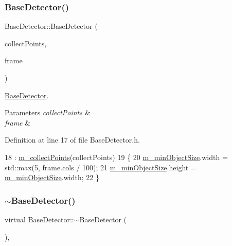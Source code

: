 \subsubsection{\texorpdfstring{Base\+Detector()}{BaseDetector()}}
{\footnotesize\ttfamily Base\+Detector\+::\+Base\+Detector (\begin{DoxyParamCaption}\item[{bool}]{collect\+Points,  }\item[{cv\+::\+U\+Mat \&}]{frame }\end{DoxyParamCaption})\hspace{0.3cm}{\ttfamily [inline]}}



\mbox{\hyperlink{class_base_detector}{Base\+Detector}}. 


\begin{DoxyParams}{Parameters}
{\em collect\+Points} & \\
\hline
{\em frame} & \\
\hline
\end{DoxyParams}


Definition at line 17 of file Base\+Detector.\+h.


\begin{DoxyCode}
18         : \mbox{\hyperlink{class_base_detector_a403cbf784fcb960bdb7d080c86c4a2ea}{m\_collectPoints}}(collectPoints)
19     \{
20         \mbox{\hyperlink{class_base_detector_a651b938c89c94daac4763728637d90c9}{m\_minObjectSize}}.width = std::max(5, frame.cols / 100);
21         \mbox{\hyperlink{class_base_detector_a651b938c89c94daac4763728637d90c9}{m\_minObjectSize}}.height = \mbox{\hyperlink{class_base_detector_a651b938c89c94daac4763728637d90c9}{m\_minObjectSize}}.width;
22     \}
\end{DoxyCode}
\mbox{\label{class_base_detector_afc5cc0ccdbc1fc1b60371f22bed620fd}} 
\subsubsection{\texorpdfstring{$\sim$\+Base\+Detector()}{~BaseDetector()}}
{\footnotesize\ttfamily virtual Base\+Detector\+::$\sim$\+Base\+Detector (\begin{DoxyParamCaption}\item[{void}]{ }\end{DoxyParamCaption})\hspace{0.3cm}{\ttfamily [inline]}, {\ttfamily [virtual]}}



